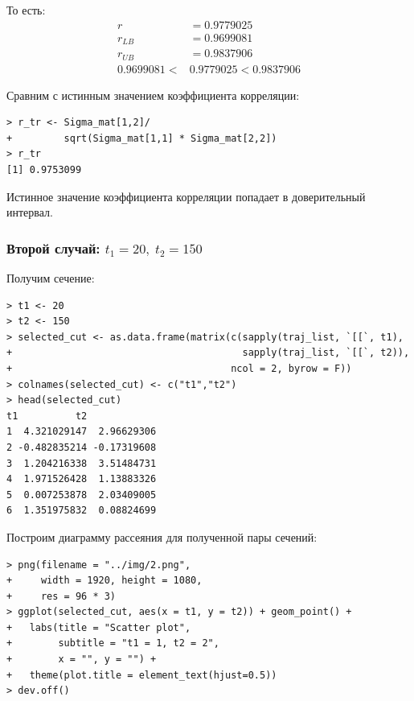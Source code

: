\documentclass[14pt,a4paper]{scrartcl}
\begin{document}
То есть:
\begin{align*}
	r &= 0.9779025\\
	r_{LB} &= 0.9699081\\
	r_{UB} &= 0.9837906\\
	0.9699081 < &0.9779025 < 0.9837906
\end{align*}

Сравним с истинным значением коэффициента корреляции:
\begin{verbatim}
> r_tr <- Sigma_mat[1,2]/
+         sqrt(Sigma_mat[1,1] * Sigma_mat[2,2])
> r_tr
[1] 0.9753099
\end{verbatim}

Истинное значение коэффициента корреляции попадает в доверительный интервал.



\pagebreak
\subsubsection*{Второй случай: $t_1 = 20, \; t_2 = 150$}
Получим сечение:

\begin{verbatim}
> t1 <- 20
> t2 <- 150
> selected_cut <- as.data.frame(matrix(c(sapply(traj_list, `[[`, t1),
+                                        sapply(traj_list, `[[`, t2)),
+                                      ncol = 2, byrow = F))
> colnames(selected_cut) <- c("t1","t2")
> head(selected_cut)
t1          t2
1  4.321029147  2.96629306
2 -0.482835214 -0.17319608
3  1.204216338  3.51484731
4  1.971526428  1.13883326
5  0.007253878  2.03409005
6  1.351975832  0.08824699
\end{verbatim}

Построим диаграмму рассеяния для полученной пары сечений:

\begin{verbatim}
> png(filename = "../img/2.png",
+     width = 1920, height = 1080,
+     res = 96 * 3)
> ggplot(selected_cut, aes(x = t1, y = t2)) + geom_point() +
+   labs(title = "Scatter plot",
+        subtitle = "t1 = 1, t2 = 2",
+        x = "", y = "") + 
+   theme(plot.title = element_text(hjust=0.5))
> dev.off()
\end{verbatim}
\end{document}
